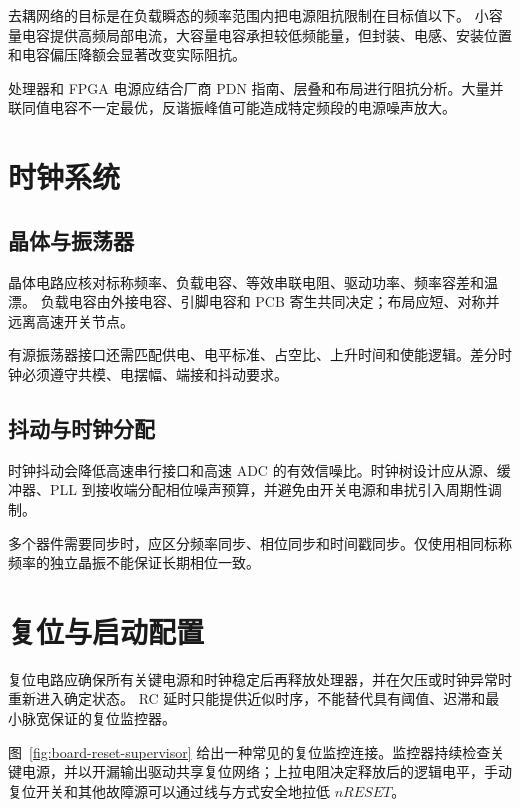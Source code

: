 去耦网络的目标是在负载瞬态的频率范围内把电源阻抗限制在目标值以下。
小容量电容提供高频局部电流，大容量电容承担较低频能量，但封装、电感、安装位置和电容偏压降额会显著改变实际阻抗。

处理器和 FPGA 电源应结合厂商 PDN 指南、层叠和布局进行阻抗分析。大量并联同值电容不一定最优，反谐振峰值可能造成特定频段的电源噪声放大。

\section{时钟系统}

\subsection{晶体与振荡器}

晶体电路应核对标称频率、负载电容、等效串联电阻、驱动功率、频率容差和温漂。
负载电容由外接电容、引脚电容和 PCB 寄生共同决定；布局应短、对称并远离高速开关节点。

有源振荡器接口还需匹配供电、电平标准、占空比、上升时间和使能逻辑。差分时钟必须遵守共模、电摆幅、端接和抖动要求。

\subsection{抖动与时钟分配}

时钟抖动会降低高速串行接口和高速 ADC 的有效信噪比。时钟树设计应从源、缓冲器、PLL 到接收端分配相位噪声预算，并避免由开关电源和串扰引入周期性调制。

多个器件需要同步时，应区分频率同步、相位同步和时间戳同步。仅使用相同标称频率的独立晶振不能保证长期相位一致。

\section{复位与启动配置}

复位电路应确保所有关键电源和时钟稳定后再释放处理器，并在欠压或时钟异常时重新进入确定状态。
RC 延时只能提供近似时序，不能替代具有阈值、迟滞和最小脉宽保证的复位监控器。

图~\ref{fig:board-reset-supervisor} 给出一种常见的复位监控连接。监控器持续检查关键电源，并以开漏输出驱动共享复位网络；上拉电阻决定释放后的逻辑电平，手动复位开关和其他故障源可以通过线与方式安全地拉低 $nRESET$。

